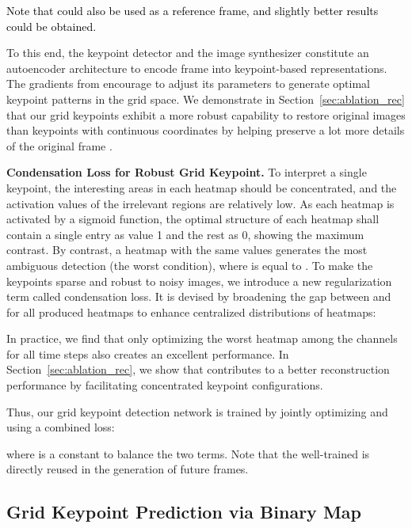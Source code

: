 \documentclass[letterpaper, 10 pt, conference]{ieeeconf}
\newcommand{\gao}[1]{{\textcolor{black}{#1}}}
\begin{document}
\gao{Note that  could also be used as a reference frame, and slightly better results could be obtained.}








To this end, the keypoint detector  and the image synthesizer  constitute an autoencoder architecture to encode frame  into keypoint-based representations.
The gradients from  encourage  to adjust its parameters to generate optimal keypoint patterns in the grid space. 
We demonstrate in Section~\ref{sec:ablation_rec} that our grid keypoints exhibit a more robust capability to restore original images than keypoints with continuous coordinates by helping preserve a lot more details of the original frame . 


\noindent\textbf{Condensation Loss for Robust Grid Keypoint.} 
To interpret a single keypoint, the interesting areas in each heatmap should be concentrated, and the activation values of the irrelevant regions are relatively low.
As each heatmap  is activated by a sigmoid function, the optimal structure of each heatmap shall contain a single entry as value 1 and the rest as 0, showing the maximum contrast.
By contrast, a heatmap with the same values generates the most ambiguous detection (the worst condition), where  is equal to .
To make the keypoints sparse and robust to noisy images, we introduce a new regularization term called condensation loss.
It is devised by broadening the gap between  and  for all produced heatmaps to enhance centralized distributions of heatmaps:

In practice, we find that only optimizing the worst heatmap among the  channels for all time steps also creates an excellent performance. 
In Section~\ref{sec:ablation_rec}, we show that  contributes to a better reconstruction performance by facilitating concentrated keypoint configurations. 




Thus, our grid keypoint detection network is trained by jointly optimizing  and  using a combined loss:

where  is a constant to balance the two terms. 
Note that the well-trained  is directly reused in the generation of future frames.


\subsection{Grid Keypoint Prediction via Binary Map} 
\end{document}
